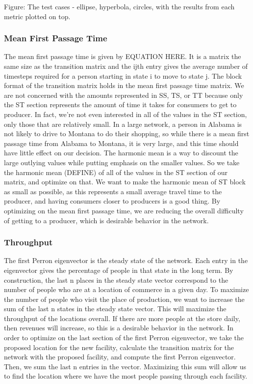 \documentclass[twoside,twocolumn]{article}
\begin{document}
Figure: The test cases - ellipse, hyperbola, circles, with the results from each metric plotted on top.


\subsubsection{Mean First Passage Time}
The mean first passage time is given by EQUATION HERE.
It is a matrix the same size as the transition matrix and the ijth entry gives the average number of timesteps required for a person starting in state i to move to state j.
The block format of the transition matrix holds in the mean first passage time matrix.
We are not concerned with the amounts represented in SS, TS, or TT because only the ST section represents the amount of time it takes for consumers to get to producer.
In fact, we're not even interested in all of the values in the ST section, only those that are relatively small.
In a large network, a person in Alabama is not likely to drive to Montana to do their shopping, so while there is a mean first passage time from Alabama to Montana, it is very large, and this time should have little effect on our decision.
The harmonic mean is a way to discount the large outlying values while putting emphasis on the smaller values.
So we take the harmonic mean (DEFINE) of all of the values in the ST section of our matrix, and optimize on that.
We want to make the harmonic mean of ST block as small as possible, as this represents a small average travel time to the producer, and having consumers closer to producers is a good thing.
By optimizing on the mean first passage time, we are reducing the overall difficulty of getting to a producer, which is desirable behavior in the network.

\subsubsection{Throughput}
The first Perron eigenvector is the steady state of the network. %
Each entry in the eigenvector gives the percentage of people in that state in the long term. %
By construction, the last n places in the steady state vector correspond to the number of people who are at a location of commerce in a given day.
To maximize the number of people who visit the place of production, we want to increase the sum of the last n states in the steady state vector.
This will maximize the throughput of the locations overall.
If there are more people at the store daily, then revenues will increase, so this is a desirable behavior in the network.
In order to optimize on the last section of the first Perron eigenvector, we take the proposed location for the new facility, calculate the transition matrix for the network with the proposed facility, and compute the first Perron eigenvector.
Then, we sum the last n entries in the vector.
Maximizing this sum will allow us to find the location where we have the most people passing through each facility.
\end{document}
